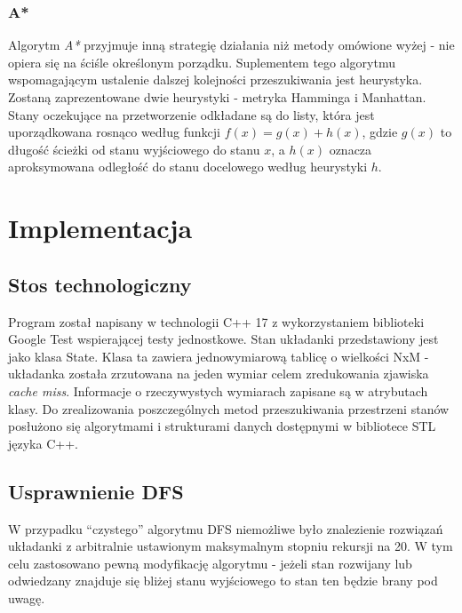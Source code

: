 \documentclass{classrep}
\begin{document}
\subsubsection{A*}
Algorytm \emph{A*} przyjmuje inną strategię działania niż metody
omówione wyżej - nie opiera się na ściśle określonym porządku. Suplementem tego
algorytmu wspomagającym ustalenie dalszej kolejności przeszukiwania jest heurystyka.
Zostaną zaprezentowane dwie heurystyki - metryka Hamminga i Manhattan.
Stany oczekujące na przetworzenie odkładane są do listy, która jest uporządkowana
rosnąco według funkcji $ f(x) = g(x) + h(x) $, gdzie $ g(x) $ to długość ścieżki
od stanu wyjściowego do stanu $ x $, a $ h(x) $ oznacza aproksymowana odległość
do stanu docelowego według heurystyki $ h $.

\section{Implementacja}
\subsection{Stos technologiczny}

Program został napisany w technologii C++ 17 z wykorzystaniem biblioteki
Google Test wspierającej testy jednostkowe. Stan układanki przedstawiony
jest jako klasa State. Klasa ta zawiera jednowymiarową tablicę o
wielkości NxM - układanka została zrzutowana na jeden wymiar celem
zredukowania zjawiska \emph{cache miss}. Informacje o rzeczywystych
wymiarach zapisane są w atrybutach klasy. Do zrealizowania
poszczególnych metod przeszukiwania przestrzeni stanów posłużono się
algorytmami i strukturami danych dostępnymi w bibliotece STL języka C++.

\subsection{Usprawnienie DFS}

W przypadku ``czystego'' algorytmu DFS niemożliwe było znalezienie rozwiązań
układanki z arbitralnie ustawionym maksymalnym stopniu rekursji na 20. W tym celu zastosowano
pewną modyfikację algorytmu - jeżeli stan rozwijany lub odwiedzany znajduje się bliżej
stanu wyjściowego to stan ten będzie brany pod uwagę.
\end{document}

